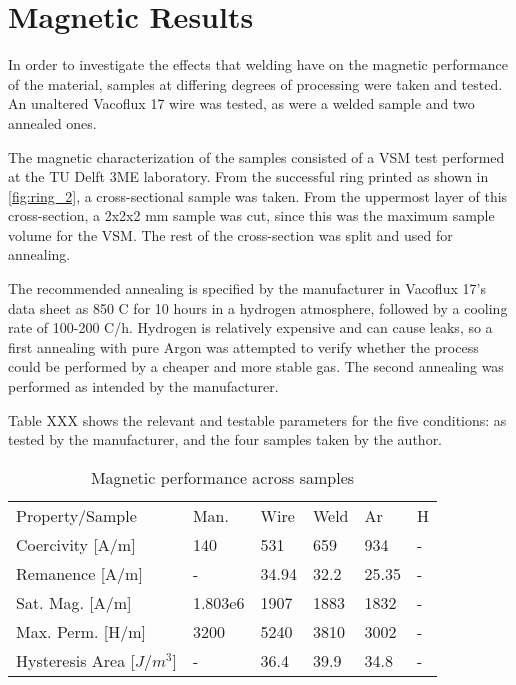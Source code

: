 \section{Magnetic Results}

In order to investigate the effects that welding have on the magnetic performance of the material, samples at differing degrees of processing were taken and tested. An unaltered Vacoflux 17 wire was tested, as were a welded sample and two annealed ones.

The magnetic characterization of the samples consisted of a VSM test performed at the TU Delft 3ME laboratory. From the successful ring printed as shown in \autoref{fig:ring_2}, a cross-sectional sample was taken. From the uppermost layer of this cross-section, a 2x2x2 mm sample was cut, since this was the maximum sample volume for the VSM. The rest of the cross-section was split and used for annealing.

The recommended annealing is specified by the manufacturer in Vacoflux 17's data sheet as 850 C for 10 hours in a hydrogen atmosphere, followed by a cooling rate of 100-200 C/h. Hydrogen is relatively expensive and can cause leaks, so a first annealing with pure Argon was attempted to verify whether the process could be performed by a cheaper and more stable gas. The second annealing was performed as intended by the manufacturer.

Table XXX shows the relevant and testable parameters for the five conditions: as tested by the manufacturer, and the four samples taken by the author.

\begin{table*}[t]
    \centering
    \caption{Magnetic performance across samples}
    \begin{tabular}{llllll}
    Property/Sample         & Man.    & Wire  & Weld & Ar    & H \\
    Coercivity [A/m]        & 140     & 531   & 659  & 934   & - \\
    Remanence [A/m]         & -       & 34.94 & 32.2 & 25.35 & - \\
    Sat. Mag. [A/m]         & 1.803e6 & 1907  & 1883 & 1832  & - \\
    Max. Perm. [H/m]        & 3200    & 5240  & 3810 & 3002  & - \\
    Hysteresis Area [$J/m^3$] & -     & 36.4  & 39.9 & 34.8  & - \\
    \end{tabular}
\end{table*}

